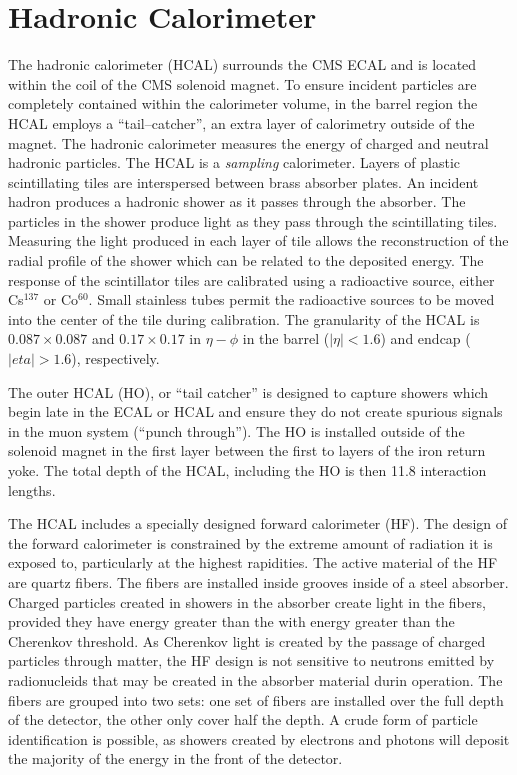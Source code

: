 \section{Hadronic Calorimeter}
\label{sec:HCAL} The hadronic calorimeter (HCAL) surrounds the CMS ECAL and is
located within the coil of the CMS solenoid magnet.  To ensure incident
particles are completely contained within the calorimeter volume, in the barrel
region the HCAL employs a ``tail--catcher'', an extra layer of calorimetry
outside of the magnet. The hadronic calorimeter measures the energy of charged
and neutral hadronic particles.  The HCAL is a \emph{sampling} calorimeter.
Layers of plastic scintillating tiles are interspersed between brass absorber
plates.  An incident hadron produces a hadronic shower as it passes through the
absorber.  The particles in the shower produce light as they pass through the
scintillating tiles.  Measuring the light produced in each layer of tile allows
the reconstruction of the radial profile of the shower which can be related to
the deposited energy.  The response of the scintillator tiles are calibrated
using a radioactive source, either Cs$^{137}$ or Co$^{60}$.  Small stainless
tubes permit the radioactive sources to be moved into the center of the tile
during calibration.  The granularity of the HCAL is $0.087 \times 0.087$ and
$0.17 \times 0.17$ in $\eta-\phi$ in the barrel ($|\eta| < 1.6$) and endcap
($|eta| > 1.6$), respectively.

The outer HCAL (HO), or ``tail catcher'' is designed to capture showers which
begin late in the ECAL or HCAL and ensure they do not create spurious signals in
the muon system (``punch through'').  The HO is installed outside of the solenoid
magnet in the first layer between the first to layers of the iron return yoke.
The total depth of the HCAL, including the HO is then 11.8 interaction lengths.

The HCAL includes a specially designed forward calorimeter (HF).  The design of
the forward calorimeter is constrained by the extreme amount of radiation it is
exposed to, particularly at the highest rapidities.  The active material of the
HF are quartz fibers.  The fibers are installed inside grooves inside of a steel
absorber.  Charged particles created in showers in the absorber create light in
the fibers, provided they have energy greater than the with energy greater than
the Cherenkov threshold.  As Cherenkov light is created by the passage of
charged particles through matter, the HF design is not sensitive to neutrons
emitted by radionucleids that may be created in the absorber material durin
operation.  The fibers are grouped into two sets: one set of fibers are
installed over the full depth of the detector, the other only cover half the
depth.  A crude form of particle identification is possible, as showers created
by electrons and photons will deposit the majority of the energy in the front of
the detector.

